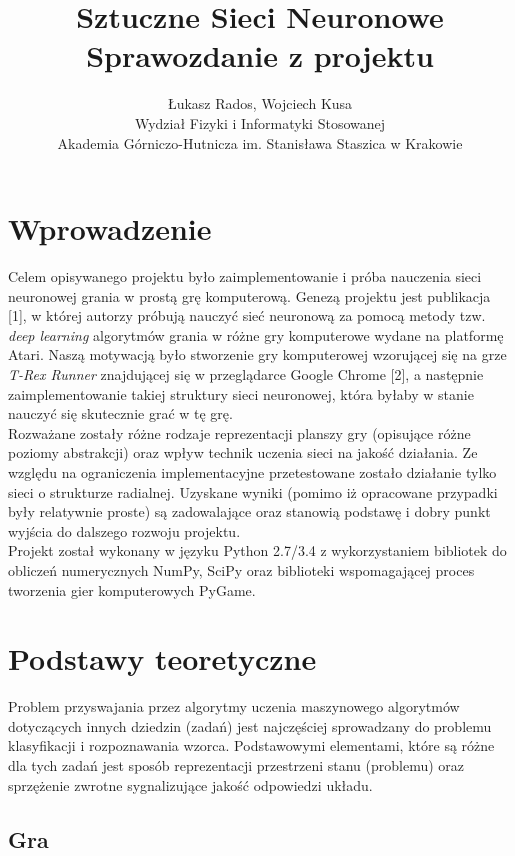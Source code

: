 \documentclass[11pt]{article} %
\title{Sztuczne Sieci Neuronowe \\ \large Sprawozdanie z projektu}
\author{Łukasz Rados, Wojciech Kusa \\ Wydział Fizyki i Informatyki Stosowanej \\ Akademia Górniczo-Hutnicza im. Stanisława Staszica w Krakowie}
\begin{document}
\maketitle

\section{Wprowadzenie}
Celem opisywanego projektu było zaimplementowanie i próba nauczenia sieci neuronowej grania w prostą grę komputerową. Genezą projektu jest publikacja [1], w której autorzy próbują nauczyć sieć neuronową za pomocą metody tzw. \textit{deep learning} algorytmów grania w różne gry komputerowe wydane na platformę Atari. Naszą motywacją było stworzenie gry komputerowej wzorującej się na grze \textit{T-Rex Runner} znajdującej się w przeglądarce Google Chrome [2], a następnie zaimplementowanie takiej struktury sieci neuronowej, która byłaby w stanie nauczyć się skutecznie grać w tę grę. \\

Rozważane zostały różne rodzaje reprezentacji planszy gry (opisujące różne poziomy abstrakcji) oraz wpływ technik uczenia sieci na jakość działania. Ze względu na ograniczenia implementacyjne przetestowane zostało działanie tylko sieci o strukturze radialnej. Uzyskane wyniki (pomimo iż opracowane przypadki były relatywnie proste) są zadowalające oraz stanowią podstawę i dobry punkt wyjścia do dalszego rozwoju projektu. \\

Projekt został wykonany w języku Python 2.7/3.4 z wykorzystaniem bibliotek do obliczeń numerycznych NumPy, SciPy oraz biblioteki wspomagającej proces tworzenia gier komputerowych PyGame.\\


\section{Podstawy teoretyczne}

Problem przyswajania przez algorytmy uczenia maszynowego algorytmów dotyczących innych dziedzin (zadań) jest najczęściej sprowadzany do problemu klasyfikacji i rozpoznawania wzorca. Podstawowymi elementami, które są różne dla tych zadań jest sposób reprezentacji przestrzeni stanu (problemu) oraz sprzężenie zwrotne sygnalizujące jakość odpowiedzi układu. \\

\subsection{Gra}
\end{document}

